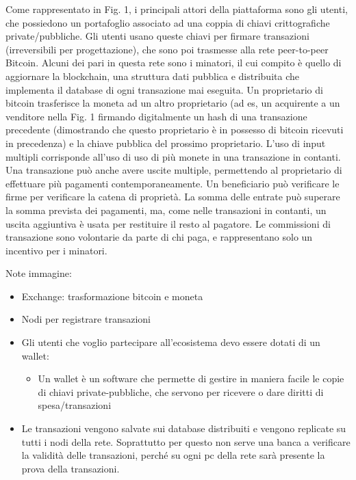 Come rappresentato in Fig. 1, i principali attori della piattaforma sono gli utenti, che possiedono un portafoglio
associato ad una coppia di chiavi crittografiche private/pubbliche. Gli utenti usano queste chiavi per firmare
transazioni (irreversibili per progettazione), che sono poi trasmesse alla rete peer-to-peer Bitcoin. Alcuni dei pari
in questa rete sono i minatori, il cui compito è quello di aggiornare la blockchain, una struttura dati pubblica e
distribuita che implementa il database di ogni transazione mai eseguita.
Un proprietario di bitcoin trasferisce la moneta ad un altro proprietario (ad es, un acquirente a un venditore nella
Fig. 1 firmando digitalmente un hash di una transazione precedente (dimostrando che questo proprietario è in
possesso di bitcoin ricevuti in precedenza) e la chiave pubblica del prossimo proprietario. L'uso di input multipli
corrisponde all'uso di uso di più monete in una transazione in contanti. Una transazione può anche avere uscite
multiple, permettendo al proprietario di effettuare più pagamenti contemporaneamente. Un beneficiario può
verificare le firme per verificare la catena di proprietà. La somma delle entrate può superare la somma prevista dei
pagamenti, ma, come nelle transazioni in contanti, un uscita aggiuntiva è usata per restituire il resto al pagatore.
Le commissioni di transazione sono volontarie da parte di chi paga, e rappresentano solo un incentivo per i
minatori.

\singlespacing

Note immagine:

\begin{itemize}
    \item Exchange: trasformazione bitcoin e moneta
    
    \item Nodi per registrare transazioni
    
    \item Gli utenti che voglio partecipare all’ecosistema devo essere dotati di un wallet:
    
    \begin{itemize}
        \item Un wallet è un software che permette di gestire in maniera facile le copie di chiavi private-pubbliche, che servono per ricevere o dare diritti di spesa/transazioni
    \end{itemize}
    
    \item Le transazioni vengono salvate sui database distribuiti e vengono replicate su tutti i nodi della rete. Soprattutto per questo non serve una banca a verificare la validità delle transazioni, perché su ogni pc della rete sarà presente la prova della transazioni.
\end{itemize}

